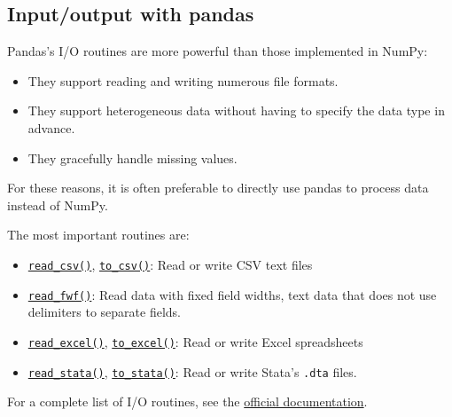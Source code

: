 \documentclass{scrartcl}
\providecommand{\tightlist}{%
      \setlength{\itemsep}{0pt}\setlength{\parskip}{0pt}}
\begin{document}
\hypertarget{inputoutput-with-pandas}{%
\subsection{Input/output with pandas}\label{inputoutput-with-pandas}}

Pandas's I/O routines are more powerful than those implemented in NumPy:

\begin{itemize}
\tightlist
\item
  They support reading and writing numerous file formats.
\item
  They support heterogeneous data without having to specify the data
  type in advance.
\item
  They gracefully handle missing values.
\end{itemize}

For these reasons, it is often preferable to directly use pandas to
process data instead of NumPy.

The most important routines are:

\begin{itemize}
\tightlist
\item
  \href{https://pandas.pydata.org/pandas-docs/stable/reference/api/pandas.read_csv.html}{\texttt{read\_csv()}},
  \href{https://pandas.pydata.org/pandas-docs/stable/reference/api/pandas.DataFrame.to_csv.html}{\texttt{to\_csv()}}:
  Read or write CSV text files
\item
  \href{https://pandas.pydata.org/pandas-docs/stable/reference/api/pandas.read_fwf.html}{\texttt{read\_fwf()}}:
  Read data with fixed field widths, \ie text data that does not use
  delimiters to separate fields.
\item
  \href{https://pandas.pydata.org/pandas-docs/stable/reference/api/pandas.read_excel.html}{\texttt{read\_excel()}},
  \href{https://pandas.pydata.org/pandas-docs/stable/reference/api/pandas.DataFrame.to_excel.html}{\texttt{to\_excel()}}:
  Read or write Excel spreadsheets
\item
  \href{https://pandas.pydata.org/pandas-docs/stable/reference/api/pandas.read_stata.html}{\texttt{read\_stata()}},
  \href{https://pandas.pydata.org/pandas-docs/stable/reference/api/pandas.DataFrame.to_stata.html}{\texttt{to\_stata()}}:
  Read or write Stata's \texttt{.dta} files.
\end{itemize}

For a complete list of I/O routines, see the
\href{https://pandas.pydata.org/pandas-docs/stable/user_guide/io.html}{official
documentation}.
\end{document}
